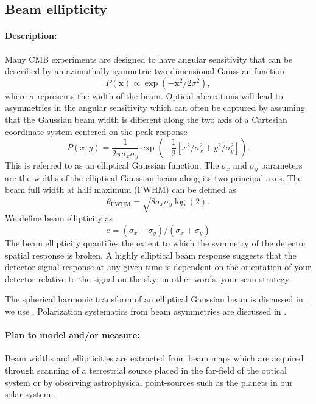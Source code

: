\subsection{Beam ellipticity}

\paragraph{Description:}
Many CMB experiments are designed to have angular sensitivity that can be described by an azimuthally symmetric two-dimensional Gaussian function
\begin{equation} 
P (\mathbf{x}) \propto \exp (-\mathbf{x} ^2/2\sigma ^2),
\end{equation}
where $\sigma$ represents the width of the beam. Optical aberrations will lead to asymmetries in the angular sensitivity which can often be captured by assuming that the Gaussian beam width is different along the two axis of a Cartesian coordinate system centered on the peak response
\begin{equation}
P (x,y) = \frac{1}{2\pi \sigma_x \sigma_y} \exp (-\frac{1}{2}[x^2/\sigma ^2_x + y^2/\sigma ^2_y]).
\end{equation}
This is referred to as an elliptical Gaussian function. The $\sigma_x$ and $\sigma_y$ parameters are the widths of the elliptical Gaussian beam along its two principal axes. The beam full width at half maximum (FWHM) can be defined as
\begin{equation}
\theta _\mathrm{FWHM} = \sqrt{8\sigma_x \sigma_y\log{(2)}}. 
\end{equation}
We define beam ellipticity as 
\begin{equation}
e = (\sigma_x-\sigma_y)/(\sigma_x+\sigma_y)
\end{equation}
The beam ellipticity quantifies the extent to which the symmetry of the detector spatial response is broken. A highly elliptical beam response suggests that the detector signal response at any given time is dependent on the orientation of your detector relative to the signal on the sky; in other words, your scan strategy.

The spherical harmonic transform of an elliptical Gaussian beam is discussed in \cite{Souradeep2001}. we use \cite{Takahashi2010}. Polarization systematics from beam asymmetries are discussed in \cite{Shimon_2008}.

\paragraph{Plan to model and/or measure:}
Beam widths and ellipticities are extracted from beam maps which are acquired through scanning of a terrestrial source placed in the far-field of the optical system or by observing astrophysical point-sources such as the planets in our solar system \cite{planck16i, weiland11, Planck2017_planet_flux}. 


